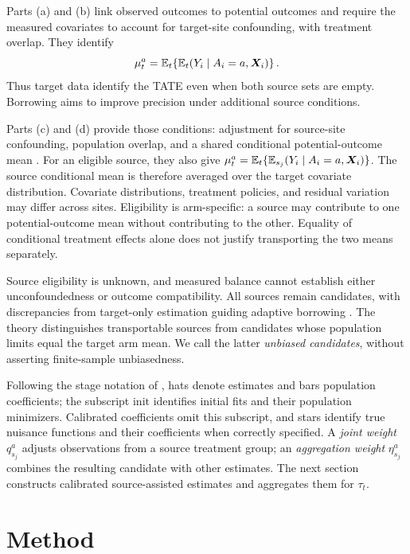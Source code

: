 \documentclass[12pt]{article}
\begin{document}
Parts (a) and (b) link observed outcomes to potential outcomes and require the measured covariates to account for target-site confounding, with treatment overlap. They identify
\[
\mu_t^a=\mathbb{E}_t\!\left\{\mathbb{E}_t(Y_i\mid A_i=a,\boldsymbol X_i)\right\}.
\]
Thus target data identify the TATE even when both source sets are empty. Borrowing aims to improve precision under additional source conditions.

Parts (c) and (d) provide those conditions: adjustment for source-site confounding, population overlap, and a shared conditional potential-outcome mean \citep{cole2010generalizing,pearl2014external,dahabreh2019generalizing}. For an eligible source, they also give $\mu_t^a=\mathbb{E}_t\{\mathbb{E}_{s_j}(Y_i\mid A_i=a,\boldsymbol X_i)\}$. The source conditional mean is therefore averaged over the target covariate distribution. Covariate distributions, treatment policies, and residual variation may differ across sites. Eligibility is arm-specific: a source may contribute to one potential-outcome mean without contributing to the other. Equality of conditional treatment effects alone does not justify transporting the two means separately.

Source eligibility is unknown, and measured balance cannot establish either unconfoundedness or outcome compatibility. All sources remain candidates, with discrepancies from target-only estimation guiding adaptive borrowing \citep{han2025federated}. The theory distinguishes transportable sources from candidates whose population limits equal the target arm mean. We call the latter \emph{unbiased candidates}, without asserting finite-sample unbiasedness.

Following the stage notation of \citet{hou2025efficient}, hats denote estimates and bars population coefficients; the subscript $\mathrm{init}$ identifies initial fits and their population minimizers. Calibrated coefficients omit this subscript, and stars identify true nuisance functions and their coefficients when correctly specified. A \emph{joint weight} $q_{s_j}^a$ adjusts observations from a source treatment group; an \emph{aggregation weight} $\eta_{s_j}^a$ combines the resulting candidate with other estimates. The next section constructs calibrated source-assisted estimates and aggregates them for $\tau_t$.

\section{Method}\label{sec:method}
\end{document}

